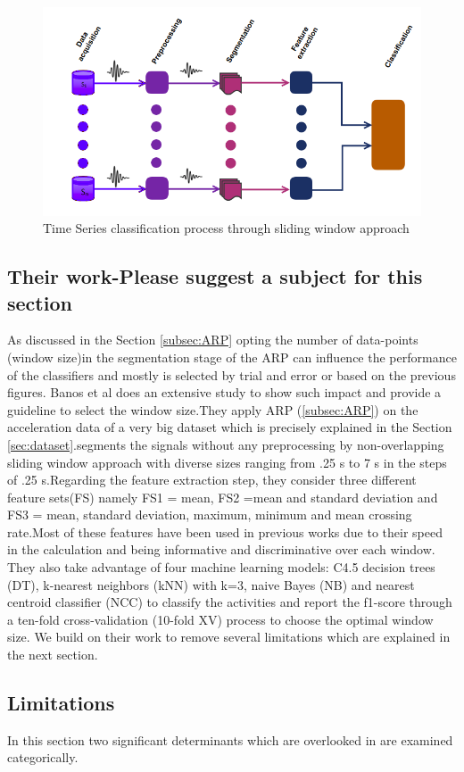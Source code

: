 \begin{figure}[h]
    \centering
    \includegraphics[width=.4\textwidth]{Figures/HARP.png}
    \caption{Time Series classification process through sliding window approach}
    \label{fig:tsprocess}
\end{figure}


\subsection{Their work-Please suggest a subject for this section} \label{sub:theirwork}
As discussed in the Section \ref{subsec:ARP} opting the number of data-points (window size)in the segmentation stage of the ARP can influence the performance of the classifiers and mostly is selected by trial and error or based on the previous figures. Banos et al \cite{banos2014window} does an extensive study to show such impact and provide a guideline to select the window size.They apply ARP (\ref{subsec:ARP}) on the acceleration data of a very big dataset \cite{banos2012benchmark} which is precisely explained in the Section \ref{sec:dataset}.\cite{banos2014window}segments the signals without any preprocessing by non-overlapping sliding window approach with diverse sizes ranging from .25 s to 7 s in the steps of .25 s.Regarding the feature extraction step, they consider three different feature sets(FS) namely FS1 = {mean}, FS2 ={mean and standard deviation} and FS3 = {mean, standard deviation, maximum, minimum and mean crossing rate}.Most of these features have been used in previous works due to their speed in the calculation and being informative and discriminative over each window. They also take advantage of four machine learning models: C4.5 decision trees (DT), k-nearest neighbors (kNN) with k=3, naive Bayes (NB) and nearest centroid classifier (NCC) to classify the activities and report the f1-score through a ten-fold cross-validation (10-fold XV) process to choose the optimal window size. We build on their work to remove several limitations which are explained in the next section.

\subsection{Limitations}
In this section two significant determinants which are overlooked in \cite{banos2014window} are examined categorically.

